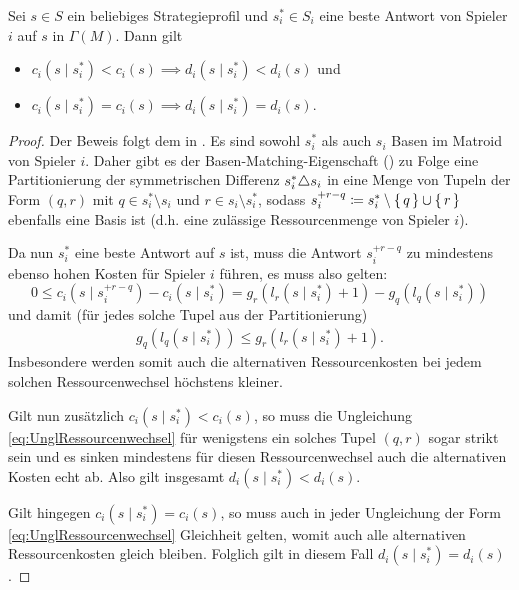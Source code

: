 \begin{prop}\label{prop:BAPotentialFuerMatroidspieleHilfsP}
	Sei $s \in S$ ein beliebiges Strategieprofil und $s^\ast_i \in S_i$ eine beste Antwort von Spieler $i$ auf $s$ in $\Gamma(M)$. Dann gilt
	\begin{itemize}
		\item $c_i(s \mid s^\ast_i) < c_i(s) \implies d_i(s \mid s^\ast_i) < d_i(s)$ und
		\item $c_i(s \mid s^\ast_i) = c_i(s) \implies d_i(s \mid s^\ast_i) = d_i(s)$.
	\end{itemize}
\end{prop}

\begin{proof}
	Der Beweis folgt dem in \cite[Lemma 2.6]{BAPfadLaengeInAusl}. Es sind sowohl $s^\ast_i$ als auch $s_i$ Basen im Matroid von Spieler $i$. Daher gibt es der Basen-Matching-Eigenschaft () zu Folge eine Partitionierung der symmetrischen Differenz $s^\ast_i \triangle s_i$ in eine Menge von Tupeln der Form $(q,r)$ mit $q \in s^\ast_i\setminus s_i$ und $r \in s_i \setminus s^\ast_i$, sodass $s_i^{+r-q} \coloneqq s^\ast_i\setminus\set{q}\cup\set{r}$ ebenfalls eine Basis ist (d.h. eine zulässige Ressourcenmenge von Spieler $i$).
	
	Da nun $s^\ast_i$ eine beste Antwort auf $s$ ist, muss die Antwort $s_i^{+r-q}$ zu mindestens ebenso hohen Kosten für Spieler $i$ führen, es muss also gelten:
		\[0 \leq c_i(s \mid s_i^{+r-q}) - c_i(s \mid s^\ast_i) = g_r(l_r(s \mid s^\ast_i)+1) - g_q(l_q(s \mid s^\ast_i))\]
	und damit (für jedes solche Tupel aus der Partitionierung)
	\begin{align}\label{eq:UnglRessourcenwechsel}
		g_q(l_q(s \mid s^\ast_i)) \leq g_r(l_r(s \mid s^\ast_i)+1).
	\end{align}
	Insbesondere werden somit auch die alternativen Ressourcenkosten bei jedem solchen Ressourcenwechsel höchstens kleiner.
	
	Gilt nun zusätzlich $c_i(s \mid s^\ast_i) < c_i(s)$, so muss die Ungleichung \eqref{eq:UnglRessourcenwechsel} für wenigstens ein solches Tupel $(q,r)$ sogar strikt sein und es sinken mindestens für diesen Ressourcenwechsel auch die alternativen Kosten echt ab. Also gilt insgesamt $d_i(s \mid s^\ast_i) < d_i(s)$.
	
	Gilt hingegen $c_i(s \mid s^\ast_i) = c_i(s)$, so muss auch in jeder Ungleichung der Form \eqref{eq:UnglRessourcenwechsel} Gleichheit gelten, womit auch alle alternativen Ressourcenkosten gleich bleiben. Folglich gilt in diesem Fall $d_i(s \mid s^\ast_i) = d_i(s)$.
\end{proof}


